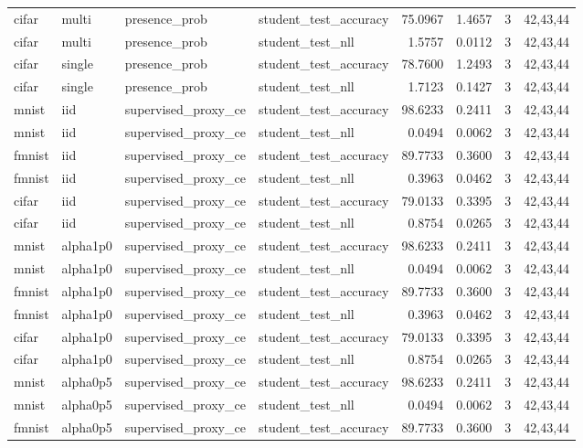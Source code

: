 \begin{tabular}{llllrrrl}
cifar & multi & presence\_prob & student\_test\_accuracy & 75.0967 & 1.4657 & 3 & 42,43,44 \\
cifar & multi & presence\_prob & student\_test\_nll & 1.5757 & 0.0112 & 3 & 42,43,44 \\
cifar & single & presence\_prob & student\_test\_accuracy & 78.7600 & 1.2493 & 3 & 42,43,44 \\
cifar & single & presence\_prob & student\_test\_nll & 1.7123 & 0.1427 & 3 & 42,43,44 \\
mnist & iid & supervised\_proxy\_ce & student\_test\_accuracy & 98.6233 & 0.2411 & 3 & 42,43,44 \\
mnist & iid & supervised\_proxy\_ce & student\_test\_nll & 0.0494 & 0.0062 & 3 & 42,43,44 \\
fmnist & iid & supervised\_proxy\_ce & student\_test\_accuracy & 89.7733 & 0.3600 & 3 & 42,43,44 \\
fmnist & iid & supervised\_proxy\_ce & student\_test\_nll & 0.3963 & 0.0462 & 3 & 42,43,44 \\
cifar & iid & supervised\_proxy\_ce & student\_test\_accuracy & 79.0133 & 0.3395 & 3 & 42,43,44 \\
cifar & iid & supervised\_proxy\_ce & student\_test\_nll & 0.8754 & 0.0265 & 3 & 42,43,44 \\
mnist & alpha1p0 & supervised\_proxy\_ce & student\_test\_accuracy & 98.6233 & 0.2411 & 3 & 42,43,44 \\
mnist & alpha1p0 & supervised\_proxy\_ce & student\_test\_nll & 0.0494 & 0.0062 & 3 & 42,43,44 \\
fmnist & alpha1p0 & supervised\_proxy\_ce & student\_test\_accuracy & 89.7733 & 0.3600 & 3 & 42,43,44 \\
fmnist & alpha1p0 & supervised\_proxy\_ce & student\_test\_nll & 0.3963 & 0.0462 & 3 & 42,43,44 \\
cifar & alpha1p0 & supervised\_proxy\_ce & student\_test\_accuracy & 79.0133 & 0.3395 & 3 & 42,43,44 \\
cifar & alpha1p0 & supervised\_proxy\_ce & student\_test\_nll & 0.8754 & 0.0265 & 3 & 42,43,44 \\
mnist & alpha0p5 & supervised\_proxy\_ce & student\_test\_accuracy & 98.6233 & 0.2411 & 3 & 42,43,44 \\
mnist & alpha0p5 & supervised\_proxy\_ce & student\_test\_nll & 0.0494 & 0.0062 & 3 & 42,43,44 \\
fmnist & alpha0p5 & supervised\_proxy\_ce & student\_test\_accuracy & 89.7733 & 0.3600 & 3 & 42,43,44 \\

\end{tabular}
